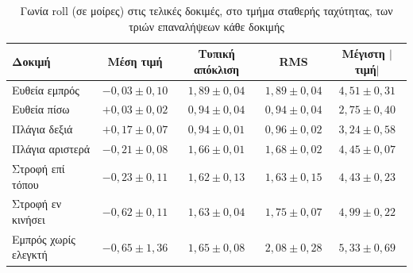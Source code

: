 \begin{table}[htbp]
    \centering
    \small
    \begin{tabular}{@{}l c c c c@{}}
        \toprule
        Δοκιμή & Μέση τιμή & Τυπική απόκλιση & RMS & Μέγιστη $|$τιμή$|$ \\
        \midrule
        Ευθεία εμπρός & $-0{,}03 \pm 0{,}10$ & $1{,}89 \pm 0{,}04$ & $1{,}89 \pm 0{,}04$ & $4{,}51 \pm 0{,}31$ \\
        Ευθεία πίσω & $+0{,}03 \pm 0{,}02$ & $0{,}94 \pm 0{,}04$ & $0{,}94 \pm 0{,}04$ & $2{,}75 \pm 0{,}40$ \\
        Πλάγια δεξιά & $+0{,}17 \pm 0{,}07$ & $0{,}94 \pm 0{,}01$ & $0{,}96 \pm 0{,}02$ & $3{,}24 \pm 0{,}58$ \\
        Πλάγια αριστερά & $-0{,}21 \pm 0{,}08$ & $1{,}66 \pm 0{,}01$ & $1{,}68 \pm 0{,}02$ & $4{,}45 \pm 0{,}07$ \\
        Στροφή επί τόπου & $-0{,}23 \pm 0{,}11$ & $1{,}62 \pm 0{,}13$ & $1{,}63 \pm 0{,}15$ & $4{,}43 \pm 0{,}23$ \\
        Στροφή εν κινήσει & $-0{,}62 \pm 0{,}11$ & $1{,}63 \pm 0{,}04$ & $1{,}75 \pm 0{,}07$ & $4{,}99 \pm 0{,}22$ \\
        Εμπρός χωρίς ελεγκτή & $-0{,}65 \pm 1{,}36$ & $1{,}65 \pm 0{,}08$ & $2{,}08 \pm 0{,}28$ & $5{,}33 \pm 0{,}69$ \\
        \bottomrule
    \end{tabular}
    \caption[Γωνία roll στις τελικές δοκιμές]{Γωνία roll (σε μοίρες) στις τελικές δοκιμές, στο τμήμα σταθερής ταχύτητας, των τριών επαναλήψεων κάθε δοκιμής}
    \label{tab:final-roll}
\end{table}

